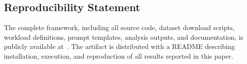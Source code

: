\documentclass[conference]{IEEEtran}
\begin{document}
\subsection*{Reproducibility Statement}
The complete framework, including all source code, dataset download scripts, workload definitions, prompt templates, analysis outputs, and documentation, is publicly available at~\cite{sharma2026framework}. The artifact is distributed with a README describing installation, execution, and reproduction of all results reported in this paper.



\end{document}
